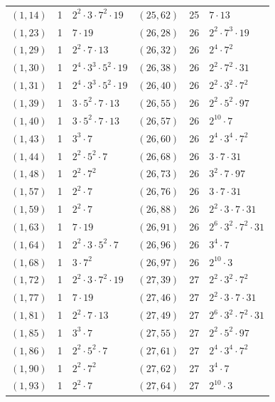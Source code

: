 \documentclass[11pt]{article}
\begin{document}
\begin{longtable}{@{}lrl@{\qquad}lrl@{}}
$(1,14)$ & 1 & $2^{2}\cdot 3\cdot 7^{2}\cdot 19$ & $(25,62)$ & 25 & $7\cdot 13$\\
$(1,23)$ & 1 & $7\cdot 19$ & $(26,28)$ & 26 & $2^{2}\cdot 7^{3}\cdot 19$\\
$(1,29)$ & 1 & $2^{2}\cdot 7\cdot 13$ & $(26,32)$ & 26 & $2^{4}\cdot 7^{2}$\\
$(1,30)$ & 1 & $2^{4}\cdot 3^{3}\cdot 5^{2}\cdot 19$ & $(26,38)$ & 26 & $2^{2}\cdot 7^{2}\cdot 31$\\
$(1,31)$ & 1 & $2^{4}\cdot 3^{3}\cdot 5^{2}\cdot 19$ & $(26,40)$ & 26 & $2^{2}\cdot 3^{2}\cdot 7^{2}$\\
$(1,39)$ & 1 & $3\cdot 5^{2}\cdot 7\cdot 13$ & $(26,55)$ & 26 & $2^{2}\cdot 5^{2}\cdot 97$\\
$(1,40)$ & 1 & $3\cdot 5^{2}\cdot 7\cdot 13$ & $(26,57)$ & 26 & $2^{10}\cdot 7$\\
$(1,43)$ & 1 & $3^{3}\cdot 7$ & $(26,60)$ & 26 & $2^{4}\cdot 3^{4}\cdot 7^{2}$\\
$(1,44)$ & 1 & $2^{2}\cdot 5^{2}\cdot 7$ & $(26,68)$ & 26 & $3\cdot 7\cdot 31$\\
$(1,48)$ & 1 & $2^{2}\cdot 7^{2}$ & $(26,73)$ & 26 & $3^{2}\cdot 7\cdot 97$\\
$(1,57)$ & 1 & $2^{2}\cdot 7$ & $(26,76)$ & 26 & $3\cdot 7\cdot 31$\\
$(1,59)$ & 1 & $2^{2}\cdot 7$ & $(26,88)$ & 26 & $2^{2}\cdot 3\cdot 7\cdot 31$\\
$(1,63)$ & 1 & $7\cdot 19$ & $(26,91)$ & 26 & $2^{6}\cdot 3^{2}\cdot 7^{2}\cdot 31$\\
$(1,64)$ & 1 & $2^{2}\cdot 3\cdot 5^{2}\cdot 7$ & $(26,96)$ & 26 & $3^{4}\cdot 7$\\
$(1,68)$ & 1 & $3\cdot 7^{2}$ & $(26,97)$ & 26 & $2^{10}\cdot 3$\\
$(1,72)$ & 1 & $2^{2}\cdot 3\cdot 7^{2}\cdot 19$ & $(27,39)$ & 27 & $2^{2}\cdot 3^{2}\cdot 7^{2}$\\
$(1,77)$ & 1 & $7\cdot 19$ & $(27,46)$ & 27 & $2^{2}\cdot 3\cdot 7\cdot 31$\\
$(1,81)$ & 1 & $2^{2}\cdot 7\cdot 13$ & $(27,49)$ & 27 & $2^{6}\cdot 3^{2}\cdot 7^{2}\cdot 31$\\
$(1,85)$ & 1 & $3^{3}\cdot 7$ & $(27,55)$ & 27 & $2^{2}\cdot 5^{2}\cdot 97$\\
$(1,86)$ & 1 & $2^{2}\cdot 5^{2}\cdot 7$ & $(27,61)$ & 27 & $2^{4}\cdot 3^{4}\cdot 7^{2}$\\
$(1,90)$ & 1 & $2^{2}\cdot 7^{2}$ & $(27,62)$ & 27 & $3^{4}\cdot 7$\\
$(1,93)$ & 1 & $2^{2}\cdot 7$ & $(27,64)$ & 27 & $2^{10}\cdot 3$\\

\end{longtable}
\end{document}
